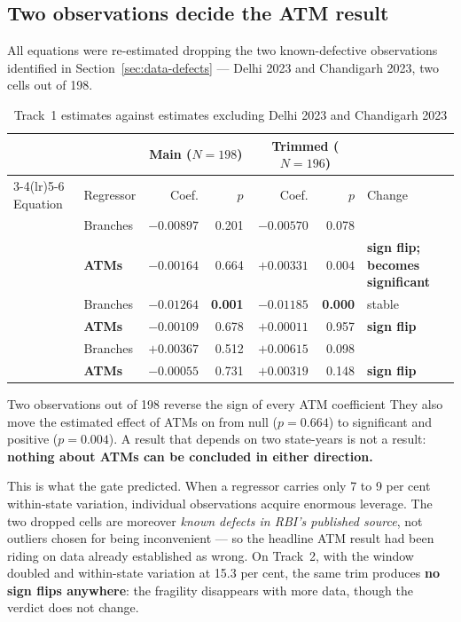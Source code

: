 \subsection{Two observations decide the ATM result}
\label{sec:h1-robustness}

All equations were re-estimated dropping the two known-defective observations identified in
Section~\ref{sec:data-defects} --- Delhi 2023 and Chandigarh 2023, two cells out of 198.

\begin{table}[H]
\centering
\caption{Track~1 estimates against estimates excluding Delhi 2023 and Chandigarh 2023}
\label{tab:robustness}
\footnotesize
\begin{tabular}{@{}llrrrrl@{}}
\toprule
& & \multicolumn{2}{c}{Main ($N=198$)} & \multicolumn{2}{c}{Trimmed ($N=196$)} & \\
\cmidrule(lr){3-4}\cmidrule(lr){5-6}
Equation & Regressor & Coef. & $p$ & Coef. & $p$ & Change \\
\midrule
\Access{} & Branches & $-0.00897$ & 0.201 & $-0.00570$ & 0.078 & \\
\Access{} & \textbf{ATMs} & $\mathbf{-0.00164}$ & 0.664 & $\mathbf{+0.00331}$ & $\mathbf{0.004}$
  & \textbf{sign flip; becomes significant} \\
\addlinespace
\Usage{}  & Branches & $-0.01264$ & \textbf{0.001} & $-0.01185$ & \textbf{0.000} & stable \\
\Usage{}  & \textbf{ATMs} & $-0.00109$ & 0.678 & $+0.00011$ & 0.957 & \textbf{sign flip} \\
\addlinespace
\AUG{}    & Branches & $+0.00367$ & 0.512 & $+0.00615$ & 0.098 & \\
\AUG{}    & \textbf{ATMs} & $-0.00055$ & 0.731 & $+0.00319$ & 0.148 & \textbf{sign flip} \\
\bottomrule
\end{tabular}
\end{table}

\begin{keybox}{Two observations out of 198 reverse the sign of every ATM coefficient}
They also move the estimated effect of ATMs on \Access{} from null ($p = 0.664$) to significant and
positive ($p = 0.004$). A result that depends on two state-years is not a result: \textbf{nothing
about ATMs can be concluded in either direction.}
\end{keybox}

\noindent
This is what the gate predicted. When a regressor carries only 7 to 9 per cent within-state
variation, individual observations acquire enormous leverage. The two dropped cells are moreover
\emph{known defects in RBI's published source}, not outliers chosen for being inconvenient --- so
the headline ATM result had been riding on data already established as wrong. On Track~2, with the
window doubled and within-state variation at 15.3 per cent, the same trim produces \textbf{no sign
flips anywhere}: the fragility disappears with more data, though the verdict does not change.

